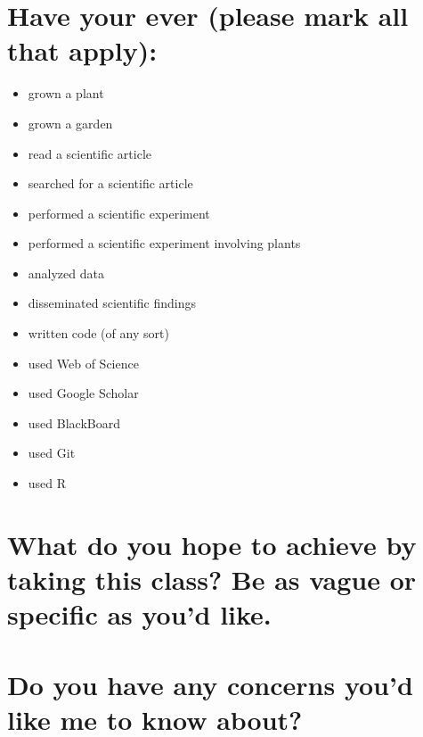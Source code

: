 \documentclass[12pt, notitlepage]{article}   	%
\def\wl{\par \vspace{\baselineskip}}
\begin{document}
\section{Have your ever (please mark all that apply):}
\begin{itemize}
	\item{grown a plant \underline{\hspace{1cm}}}
	\item{grown a garden \underline{\hspace{1cm}}}
	\item{read a scientific article \underline{\hspace{1cm}}}
	\item{searched for a scientific article \underline{\hspace{1cm}}}
	\item{performed a scientific experiment \underline{\hspace{1cm}}}
	\item{performed a scientific experiment involving plants \underline{\hspace{1cm}}}
	\item{analyzed data \underline{\hspace{1cm}}}
	\item{disseminated scientific findings \underline{\hspace{1cm}}}
	\item{written code (of any sort) \underline{\hspace{1cm}}}
	\item{used Web of Science \underline{\hspace{1cm}}}
	\item{used Google Scholar \underline{\hspace{1cm}}}
	\item{used BlackBoard \underline{\hspace{1cm}}}
	\item{used Git \underline{\hspace{1cm}}}
	\item{used R \underline{\hspace{1cm}}}
\end{itemize}

\newpage

\section{What do you hope to achieve by taking this class? 
Be as vague or specific as you'd like.}

\wl
\wl
\wl
\wl
\wl
\wl
\wl
\wl
\wl
\wl
\wl
\wl

\section{Do you have any concerns you'd like me to know about?}
\end{document}
